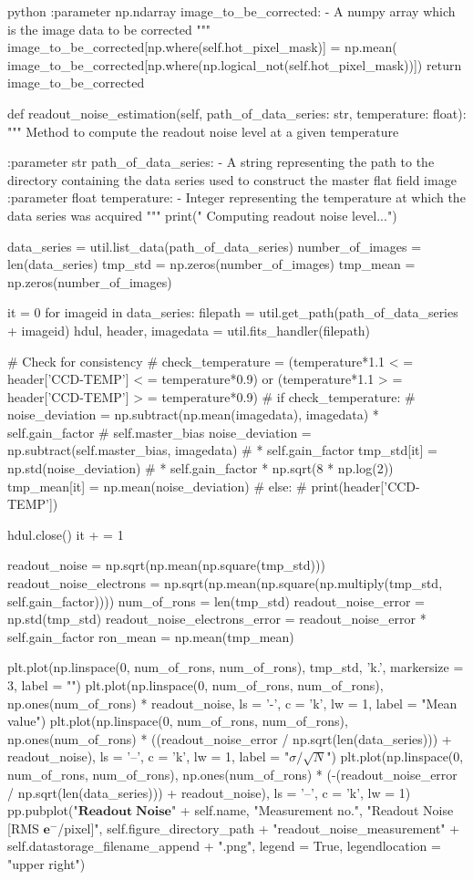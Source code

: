 \documentclass[../main.tex]{subfiles}
\begin{document}
\begin{mintedbox}{python}
:parameter np.ndarray image_to_be_corrected:
- A numpy array which is the image data to be corrected
"""
image_to_be_corrected[np.where(self.hot_pixel_mask)]  =  np.mean(
image_to_be_corrected[np.where(np.logical_not(self.hot_pixel_mask))])
return image_to_be_corrected

def readout_noise_estimation(self, path_of_data_series: str, temperature: float):
"""
Method to compute the readout noise level at a given temperature

:parameter str path_of_data_series:
- A string representing the path to the directory
containing the data series used to construct the
master flat field image
:parameter float temperature:
- Integer representing the temperature at which the data series
was acquired
"""
print(" Computing readout noise level...")

data_series  =  util.list_data(path_of_data_series)
number_of_images  =  len(data_series)
tmp_std  =  np.zeros(number_of_images)
tmp_mean  =  np.zeros(number_of_images)

it  =  0
for imageid in data_series:
filepath  =  util.get_path(path_of_data_series + imageid)
hdul, header, imagedata  =  util.fits_handler(filepath)

# Check for consistency
# check_temperature  =  (temperature*1.1 < =  header['CCD-TEMP'] < =  temperature*0.9) or (temperature*1.1 > =  header['CCD-TEMP'] > =  temperature*0.9)
# if check_temperature:
# noise_deviation      =    np.subtract(np.mean(imagedata), imagedata) * self.gain_factor # self.master_bias
noise_deviation  =  np.subtract(self.master_bias, imagedata)  # * self.gain_factor
tmp_std[it]  =  np.std(noise_deviation)  # * self.gain_factor * np.sqrt(8 * np.log(2))
tmp_mean[it]  =  np.mean(noise_deviation)
# else:
#    print(header['CCD-TEMP'])

hdul.close()
it + =  1

readout_noise  =  np.sqrt(np.mean(np.square(tmp_std)))
readout_noise_electrons  =  np.sqrt(np.mean(np.square(np.multiply(tmp_std, self.gain_factor))))
num_of_rons  =  len(tmp_std)
readout_noise_error  =  np.std(tmp_std)
readout_noise_electrons_error  =  readout_noise_error * self.gain_factor
ron_mean  =  np.mean(tmp_mean)

plt.plot(np.linspace(0, num_of_rons, num_of_rons), tmp_std, 'k.', markersize = 3, label = "")
plt.plot(np.linspace(0, num_of_rons, num_of_rons), np.ones(num_of_rons) * readout_noise, ls = '-', c = 'k', lw = 1,
label = "Mean value")
plt.plot(np.linspace(0, num_of_rons, num_of_rons),
np.ones(num_of_rons) * ((readout_noise_error / np.sqrt(len(data_series))) + readout_noise), ls = '--',
c = 'k', lw = 1, label = "$\sigma / \sqrt{N}$")
plt.plot(np.linspace(0, num_of_rons, num_of_rons),
np.ones(num_of_rons) * (-(readout_noise_error / np.sqrt(len(data_series))) + readout_noise), ls = '--',
c = 'k', lw = 1)
pp.pubplot("$\mathbf{Readout\;Noise}$" + self.name, "Measurement no.",
"Readout Noise [RMS $\mathbf{e}^-$/pixel]",
self.figure_directory_path + "readout_noise_measurement" + self.datastorage_filename_append + ".png",
legend = True, legendlocation = "upper right")


\end{mintedbox}
\end{document}
